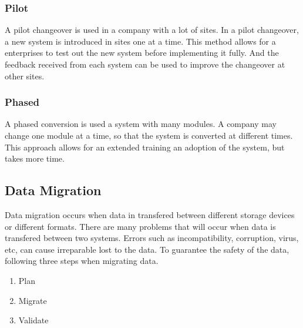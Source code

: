 \documentclass[../notes.tex]{subfiles}
\begin{document}
\subsubsection{Pilot}
A pilot changeover is used in a company with a lot of sites.
In a pilot changeover, a new system is introduced in sites one at a time.
This method allows for a enterprises to test out the new system before implementing it fully.
And the feedback received from each system can be used to improve the changeover at other sites.

\subsubsection{Phased}
A phased conversion is used a system with many modules. 
A company may change one module at a time, so that the system is converted at different times.
This approach allows for an extended training an adoption of the system, but takes more time.

\subsection{Data Migration}
Data migration occurs when data in transfered between different storage devices or different formats.
There are many problems that will occur when data is transfered between two systems. 
Errors such as incompatibility, corruption, virus, etc, can cause irreparable lost to the data.
To guarantee the safety of the data, following three steps when migrating data.

\begin{enumerate}
	\item Plan
	\item Migrate
	\item Validate
\end{enumerate}
\end{document}

